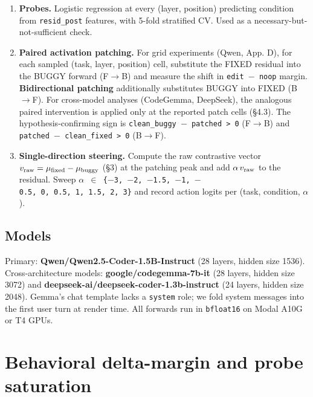\documentclass[
  11pt,
  a4paper]{article}
\providecommand{\tightlist}{%
  \setlength{\itemsep}{0pt}\setlength{\parskip}{0pt}}
\begin{document}
\begin{enumerate}
\def\labelenumi{\arabic{enumi}.}
\tightlist
\item
  \textbf{Probes.} Logistic regression at every (layer, position)
  predicting condition from \texttt{resid\_post} features, with 5-fold
  stratified CV. Used as a necessary-but-not-sufficient check.
\item
  \textbf{Paired activation patching.} For grid experiments (Qwen, App.
  D), for each sampled (task, layer, position) cell, substitute the
  FIXED residual into the BUGGY forward (F\ensuremath{\rightarrow}B) and measure the shift in
  \texttt{edit\ \ensuremath{-}\ noop} margin. \textbf{Bidirectional patching}
  additionally substitutes BUGGY into FIXED (B\ensuremath{\rightarrow}F). For cross-model
  analyses (CodeGemma, DeepSeek), the analogous paired intervention is
  applied only at the reported patch cells (\S{}4.3). The
  hypothesis-confirming sign is
  \texttt{clean\_buggy\ \ensuremath{-}\ patched\ \textgreater{}\ 0} (F\ensuremath{\rightarrow}B) and
  \texttt{patched\ \ensuremath{-}\ clean\_fixed\ \textgreater{}\ 0} (B\ensuremath{\rightarrow}F).
\item
  \textbf{Single-direction steering.} Compute the raw contrastive vector
  \(v_{\rm raw} = \mu_{\rm fixed} - \mu_{\rm buggy}\) (\S{}3) at the
  patching peak and add \(\alpha\,v_{\rm raw}\) to the residual. Sweep
  \texttt{\ensuremath{\alpha}\ \ensuremath{\in}\ \{\ensuremath{-}3,\ \ensuremath{-}2,\ \ensuremath{-}1.5,\ \ensuremath{-}1,\ \ensuremath{-}0.5,\ 0,\ 0.5,\ 1,\ 1.5,\ 2,\ 3\}}
  and record action logits per (task, condition, \ensuremath{\alpha}).
\end{enumerate}

\subsection{Models}\label{models}

Primary: \textbf{Qwen/Qwen2.5-Coder-1.5B-Instruct} (28 layers, hidden
size 1536). Cross-architecture models: \textbf{google/codegemma-7b-it}
(28 layers, hidden size 3072) and
\textbf{deepseek-ai/deepseek-coder-1.3b-instruct} (24 layers, hidden
size 2048). Gemma's chat template lacks a \texttt{system} role; we fold
system messages into the first user turn at render time. All forwards
run in \texttt{bfloat16} on Modal A10G or T4 GPUs.

\section{Behavioral delta-margin and probe
saturation}\label{behavioral-delta-margin-and-probe-saturation}
\end{document}

